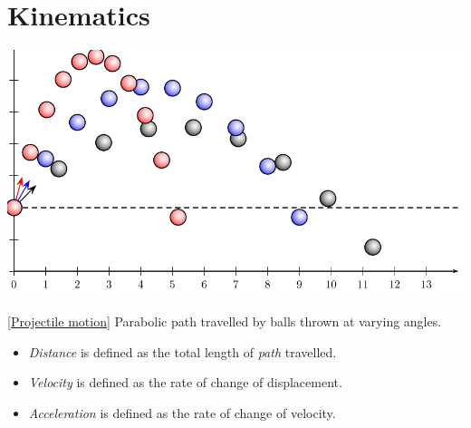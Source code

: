 \documentclass[oneside]{book}
\begin{document}


\raggedright
\chapter{Kinematics}
\begin{center}
    \includegraphics[width=\textwidth]{../images/Kinematics/schieferWurf.pdf}
    \captionsetup{type=figure}
    \caption[figure]{\ref{Projectile motion} Parabolic path travelled by balls thrown at varying angles.}
\end{center}
\begin{itemize}
    \item \textit{Distance} is defined as the total length of \emph{path} travelled.
    \item \textit{Velocity} is defined as the rate of change of displacement.
    \item \textit{Acceleration} is defined as the rate of change of velocity.
\end{itemize}
\end{document}
